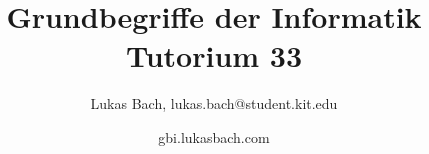 \documentclass[handout]{beamer}
\title[Grundbegriffe der Informatik]{Grundbegriffe der Informatik\\Tutorium 33}
\subtitle{}
\author{Lukas Bach, lukas.bach@student.kit.edu}
\date{gbi.lukasbach.com}
\institute{Tutorium im Wintersemester 2016/2017}
\begin{document}
	
	
	\begin{frame}
		\titlepage
	\end{frame}
	
	
\def\compiletype{print}

%

\def\compileall{1}
















\end{document}
